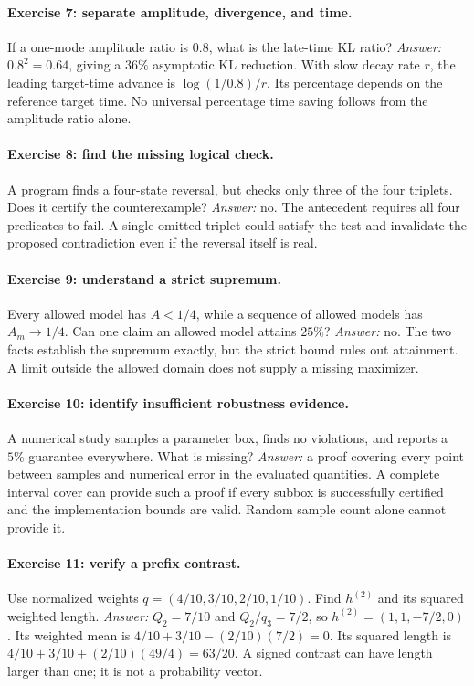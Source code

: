 \documentclass[11pt]{article}
\begin{document}
\paragraph{Exercise 7: separate amplitude, divergence, and time.}
If a one-mode amplitude ratio is $0.8$, what is the late-time KL ratio?
\emph{Answer:} $0.8^2=0.64$, giving a $36\%$ asymptotic KL reduction.
With slow decay rate $r$, the leading target-time advance is
$\log(1/0.8)/r$. Its percentage depends on the reference target time.
No universal percentage time saving follows from the amplitude ratio alone.

\paragraph{Exercise 8: find the missing logical check.}
A program finds a four-state reversal, but checks only three of the four
triplets. Does it certify the counterexample? \emph{Answer:} no. The
antecedent requires all four predicates to fail. A single omitted triplet
could satisfy the test and invalidate the proposed contradiction even if
the reversal itself is real.

\paragraph{Exercise 9: understand a strict supremum.}
Every allowed model has $A<1/4$, while a sequence of allowed models has
$A_m\to1/4$. Can one claim an allowed model attains $25\%$?
\emph{Answer:} no. The two facts establish the supremum exactly, but the
strict bound rules out attainment. A limit outside the allowed domain
does not supply a missing maximizer.

\paragraph{Exercise 10: identify insufficient robustness evidence.}
A numerical study samples a parameter box, finds no violations, and reports
a $5\%$ guarantee everywhere. What is missing? \emph{Answer:} a proof
covering every point between samples and numerical error in the evaluated
quantities. A complete interval cover can provide such a proof if every
subbox is successfully certified and the implementation bounds are valid.
Random sample count alone cannot provide it.


\paragraph{Exercise 11: verify a prefix contrast.}
Use normalized weights $q=(4/10,3/10,2/10,1/10)$.
Find $h^{(2)}$ and its squared weighted length.
\emph{Answer:} $Q_2=7/10$ and $Q_2/q_3=7/2$, so
$h^{(2)}=(1,1,-7/2,0)$. Its weighted mean is
$4/10+3/10-(2/10)(7/2)=0$. Its squared length is
$4/10+3/10+(2/10)(49/4)=63/20$. A signed contrast can have length larger
than one; it is not a probability vector.
\end{document}
